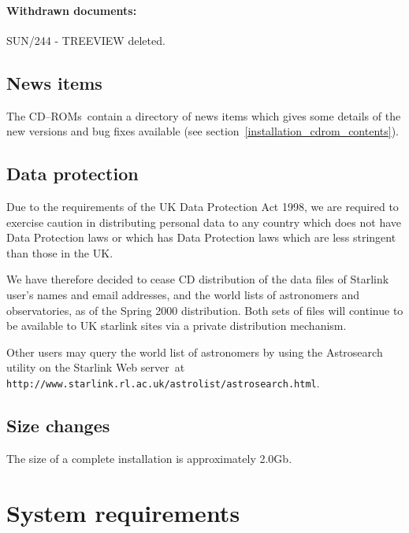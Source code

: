 \documentclass[twoside,11pt]{article}
\newcommand{\htmladdnormallink}[2]{#1}
\newcommand{\latex}[1]{#1}
\newcommand{\xlabel}[1]{}
\renewcommand{\_}{\texttt{\symbol{95}}}
\newcommand{\cdroms}{CD--ROMs}
\newcommand{\cdroms}{CD-ROMs}
\begin{document}
\paragraph{Withdrawn documents:}

SUN/244 - TREEVIEW deleted.

\subsection{News items}

The \cdroms\ contain a directory of news items which gives some
details of the new versions and bug fixes available (see
section~\ref{installation_cdrom_contents}).

\subsection{\xlabel{data_protection}Data protection}
\label{data_protection}

Due to the requirements of the UK Data Protection Act 1998, we are
required to exercise caution in distributing personal data to any country
which does not have Data Protection laws or which has Data Protection
laws which are less stringent than those in the UK.

We have therefore decided to cease CD distribution of the data files
of Starlink user's names and email addresses, and the world lists of
astronomers and observatories, as of the Spring 2000 distribution.
Both sets of files will continue to be available to UK starlink sites
via a private distribution mechanism.

Other users may query the world list of astronomers by using the
\htmladdnormallink{Astrosearch}{http://www.starlink.rl.ac.uk/astrolist/astrosearch.html} 
utility on the Starlink Web server\latex{~at 
\texttt{http://www.starlink.rl.ac.uk/astrolist/astrosearch.html}}.

\subsection{Size changes}

The size of a complete installation is approximately 2.0Gb.

\newpage
\section{\xlabel{system_requirements}System requirements}
\label{system_requirements}
\end{document}
